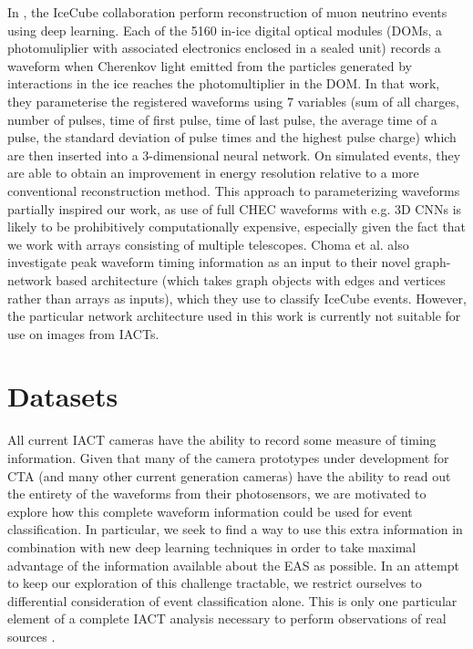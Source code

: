 In \cite{icecube1}, the IceCube collaboration perform reconstruction of muon neutrino events using deep learning. Each of the 5160 in-ice digital optical modules (DOMs, a photomuliplier with associated electronics enclosed in a sealed unit) records a waveform when Cherenkov light emitted from the particles generated by interactions in the ice reaches the photomultiplier in the DOM. In that work, they parameterise the registered waveforms using 7 variables (sum of all charges, number of pulses, time of first pulse, time of last pulse, the average time of a pulse, the standard deviation of pulse times and the highest pulse charge) which are then inserted into a 3-dimensional neural network. On simulated events, they are able to obtain an improvement in energy resolution relative to a more conventional reconstruction method. This approach to parameterizing waveforms partially inspired our work, as use of full CHEC waveforms with e.g. 3D CNNs is likely to be prohibitively computationally expensive, especially given the fact that we work with arrays consisting of multiple telescopes. Choma et al. \cite{icecubegraph} also investigate peak waveform timing information as an input to their novel graph-network based architecture (which takes graph objects with edges and vertices rather than arrays as inputs), which they use to classify IceCube events. However, the particular network architecture used in this work is currently not suitable for use on images from IACTs.

\section{Datasets} \label{Datasets}

All current IACT cameras have the ability to record some measure of timing information. Given that many of the camera prototypes under development for CTA (and many other current generation cameras) have the ability to read out the entirety of the waveforms from their photosensors, we are motivated to explore how this complete waveform information could be used for event classification. In particular, we seek to find a way to use this extra information in combination with new deep learning techniques in order to take maximal advantage of the information available about the EAS as possible. In an attempt to keep our exploration of this challenge tractable, we restrict ourselves to differential consideration of event classification alone. This is only one particular element of a complete IACT analysis necessary to perform observations of real sources \cite{Berge07}\cite{LiMa}.

